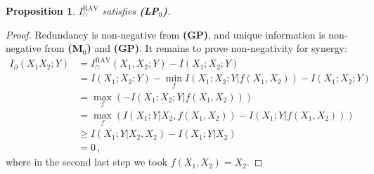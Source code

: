 \documentclass{article}
\newcommand{\ts}[1]{\ensuremath{_{\text{#1}}}}
\newcommand{\Mz}{\textbf{(M\ts{0})}\xspace} %
\newcommand{\GP}{\textbf{(GP)}\xspace} %
\newcommand{\LPz}{\textbf{(LP\ts{0})}\xspace} %
\newcommand{\IRAV}{\ensuremath{I_\cap^{\text{RAV}}}\xspace}
\newcommand{\IRAVs}{\ensuremath{I_\cap^{\text{RAV}}(X_1,X_2;Y)}\xspace}
\newtheorem{proposition}{Proposition}
\begin{document}
\begin{proposition}\label{prop:RAV-LPz}
    $\IRAV$ satisfies \LPz.
\end{proposition}
\begin{proof}
    Redundancy is non-negative from \GP, and unique information is non-negative from \Mz and \GP. It remains to prove non-negativity for synergy: 
    \begin{equation}
        \begin{aligned}
            I_\partial(X_1X_2;Y) & = \IRAVs - I(X_1;X_2;Y) \\
            & = I(X_1;X_2;Y) -\min_f I(X_1;X_2;Y|f(X_1,X_2)) - I(X_1;X_2;Y) \\
            & = \max_f \left( - I(X_1;X_2;Y|f(X_1,X_2)) \right) \\
            & = \max_f \left( I(X_1;Y|X_2,f(X_1,X_2)) - I(X_1;Y|f(X_1,X_2)) \right)  \\
            & \geq  I(X_1;Y|X_2,X_2) - I(X_1;Y|X_2) \\
            & = 0\,,
        \end{aligned}
    \end{equation}
    where in the second last step we took $f(X_1,X_2)=X_2$.
\end{proof}



\end{document}
